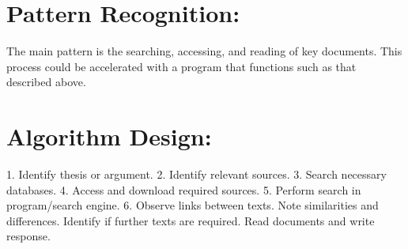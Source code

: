 \documentclass[a4paper,12pt]{article}
\begin{document}
\section{Pattern Recognition:}

The main pattern is the searching, accessing, and reading of key documents. This process could be accelerated with a program that functions such as that described above. 

\section{Algorithm Design:}

1.	Identify thesis or argument. 
2.	Identify relevant sources. 
3.	Search necessary databases.
4.	Access and download required sources. 
5.	Perform search in program/search engine. 
6.	Observe links between texts. Note similarities and differences. Identify if further texts are required. Read documents and write response. 
\end{document}
